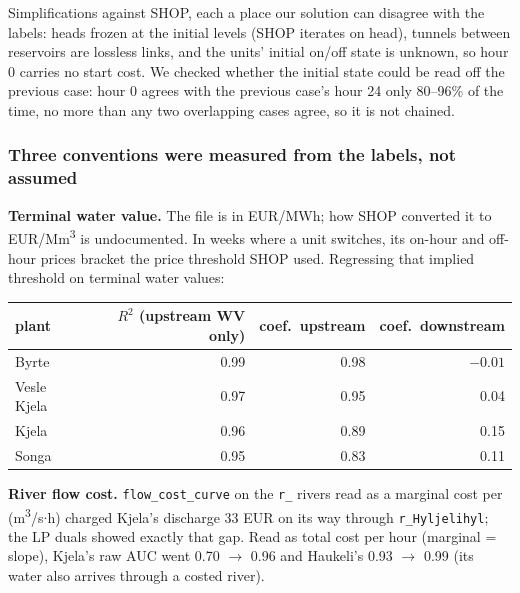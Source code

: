 Simplifications against SHOP, each a place our solution can disagree with the labels: heads frozen
at the initial levels (SHOP iterates on head), tunnels between reservoirs are lossless links, and
the units' initial on/off state is unknown, so hour 0 carries no start cost. We checked whether the
initial state could be read off the previous case: hour 0 agrees with the previous case's hour 24
only 80--96\% of the time, no more than any two overlapping cases agree, so it is not chained.

\subsubsection*{Three conventions were measured from the labels, not assumed}

\textbf{Terminal water value.} The file is in EUR/MWh; how SHOP converted it to EUR/Mm\textsuperscript{3}
is undocumented. In weeks where a unit switches, its on-hour and off-hour prices bracket the price
threshold SHOP used. Regressing that implied threshold on terminal water values:

\begin{center}\small
\begin{tabular}{lrrr}
\toprule
plant & $R^2$ (upstream WV only) & coef.\ upstream & coef.\ downstream \\
\midrule
Byrte & 0.99 & 0.98 & $-0.01$ \\
Vesle Kjela & 0.97 & 0.95 & 0.04 \\
Kjela & 0.96 & 0.89 & 0.15 \\
Songa & 0.95 & 0.83 & 0.11 \\
\bottomrule
\end{tabular}
\end{center}


\textbf{River flow cost.} \texttt{flow\_cost\_curve} on the \texttt{r\_} rivers read as a marginal
cost per (m\textsuperscript{3}/s$\cdot$h) charged Kjela's discharge 33 EUR on its way through
\texttt{r\_Hyljelihyl}; the LP duals showed exactly that gap. Read as total cost per hour (marginal
= slope), Kjela's raw AUC went 0.70 $\to$ 0.96 and Haukeli's 0.93 $\to$ 0.99 (its water also
arrives through a costed river).

